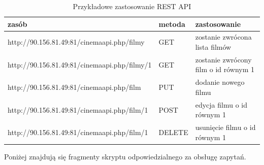 \begin{table}[H]
\centering

\label{restApi}
\begin{tabular}{|l|l|l|}
\hline
\textbf{zasób}                               & \textbf{metoda} & \textbf{zastosowanie}                \\ \hline
http://90.156.81.49:81/cinemaapi.php/filmy   & GET             & zostanie zwrócona lista filmów       \\ \hline
http://90.156.81.49:81/cinemaapi.php/filmy/1 & GET             & zostanie zwrócony film o id równym 1 \\ \hline
http://90.156.81.49:81/cinemaapi.php/film    & PUT             & dodanie nowego filmu                 \\ \hline
http://90.156.81.49:81/cinemaapi.php/film/1  & POST            & edycja filmu o id równym 1           \\ \hline
http://90.156.81.49:81/cinemaapi.php/film/1  & DELETE          & usunięcie filmu o id równym 1        \\ \hline
\end{tabular}
\caption{Przykładowe zastosowanie REST API}
\end{table}

Poniżej znajdują się fragmenty skryptu odpowiedzialnego za obsługę zapytań.



